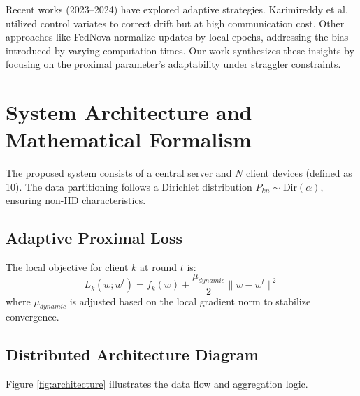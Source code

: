 \documentclass[conference]{IEEEtran}
\begin{document}
Recent works (2023--2024) have explored adaptive strategies. Karimireddy et al. \cite{karimireddy2024scaffold} utilized control variates to correct drift but at high communication cost. Other approaches like FedNova \cite{wang2020fednova} normalize updates by local epochs, addressing the bias introduced by varying computation times. Our work synthesizes these insights by focusing on the proximal parameter's adaptability under straggler constraints.

\section{System Architecture and Mathematical Formalism}\label{sec:architecture}
The proposed system consists of a central server and $N$ client devices (defined as 10). The data partitioning follows a Dirichlet distribution $P_{kn} \sim \text{Dir}(\alpha)$, ensuring non-IID characteristics.

\subsection{Adaptive Proximal Loss}
The local objective for client $k$ at round $t$ is:
\begin{equation}
    L_k(w; w^t) = f_k(w) + \frac{\mu_{dynamic}}{2} \|w - w^t\|^2
\end{equation}
where $\mu_{dynamic}$ is adjusted based on the local gradient norm to stabilize convergence.

\subsection{Distributed Architecture Diagram}\label{ssec:arch_diagram}
Figure \ref{fig:architecture} illustrates the data flow and aggregation logic.
\end{document}
